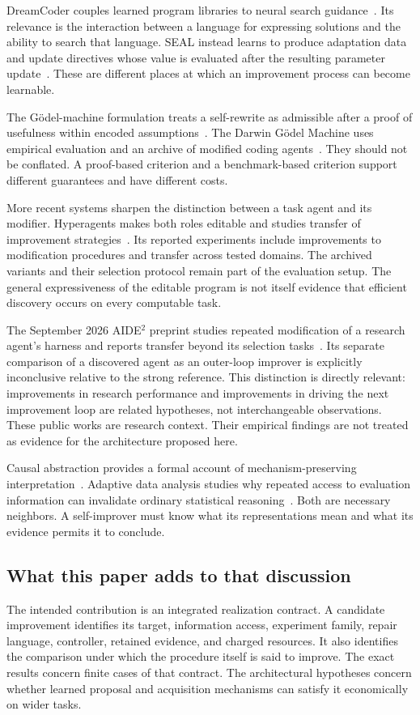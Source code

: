 DreamCoder couples learned program libraries to neural search guidance~\cite{SII:dreamcoder}. Its relevance is the interaction between a language for expressing solutions and the ability to search that language. SEAL instead learns to produce adaptation data and update directives whose value is evaluated after the resulting parameter update~\cite{SII:seal}. These are different places at which an improvement process can become learnable.

The G\"odel-machine formulation treats a self-rewrite as admissible after a proof of usefulness within encoded assumptions~\cite{SII:goedel}. The Darwin G\"odel Machine uses empirical evaluation and an archive of modified coding agents~\cite{SII:dgm}. They should not be conflated. A proof-based criterion and a benchmark-based criterion support different guarantees and have different costs.

More recent systems sharpen the distinction between a task agent and its modifier. Hyperagents makes both roles editable and studies transfer of improvement strategies~\cite{SII:hyperagents}. Its reported experiments include improvements to modification procedures and transfer across tested domains. The archived variants and their selection protocol remain part of the evaluation setup. The general expressiveness of the editable program is not itself evidence that efficient discovery occurs on every computable task.

The September 2026 AIDE$^2$ preprint studies repeated modification of a research agent's harness and reports transfer beyond its selection tasks~\cite{SII:aide}. Its separate comparison of a discovered agent as an outer-loop improver is explicitly inconclusive relative to the strong reference. This distinction is directly relevant: improvements in research performance and improvements in driving the next improvement loop are related hypotheses, not interchangeable observations. These public works are research context. Their empirical findings are not treated as evidence for the architecture proposed here.

Causal abstraction provides a formal account of mechanism-preserving interpretation~\cite{SII:geiger}. Adaptive data analysis studies why repeated access to evaluation information can invalidate ordinary statistical reasoning~\cite{SII:dwork}. Both are necessary neighbors. A self-improver must know what its representations mean and what its evidence permits it to conclude.


\subsection{What this paper adds to that discussion}
The intended contribution is an integrated realization contract. A candidate improvement identifies its target, information access, experiment family, repair language, controller, retained evidence, and charged resources. It also identifies the comparison under which the procedure itself is said to improve. The exact results concern finite cases of that contract. The architectural hypotheses concern whether learned proposal and acquisition mechanisms can satisfy it economically on wider tasks.

